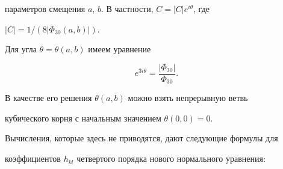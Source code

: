 параметров смещения $a$, $b$. В частности, $C=|C| e^{i\theta}$, где


$| C |=1/(8 | \Phi_{30}(a,b) |)$.


Для угла $\theta=\theta(a,b)$ имеем уравнение


$$


e^{3i\theta}=\frac {| \Phi_{30} |}{\Phi_{30}}.


$$


В качестве его решения $ \theta(a,b) $ можно взять непрерывную ветвь


кубического корня с начальным значением $ \theta(0,0)=0 $.





Вычисления, которые здесь не приводятся, дают следующие формулы для


коэффициентов $h_{kl}$ четвертого порядка нового нормального уравнения:


